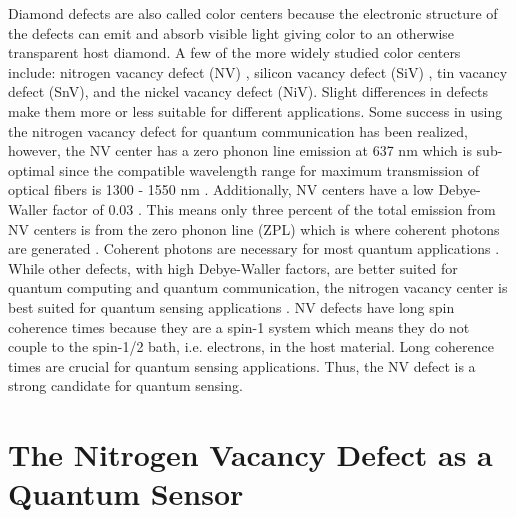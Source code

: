 	Diamond defects are also called color centers because the electronic structure of the defects can emit and absorb visible light giving color to an otherwise transparent host diamond. A few of the more widely studied color centers include: nitrogen vacancy defect (NV) \cite{Jelezko2001SpectroscopyDiamond, Gruber1997ScanningCenters}, silicon vacancy defect (SiV) \cite{Goss1996TheComplex,Clark1994SiliconDiamond}, tin vacancy defect (SnV)\cite{Iwasaki2017Tin-VacancyDiamond}, and the nickel vacancy defect (NiV)\cite{Nazare1991OpticalDiamond, Mason1999MagneticDiamond}. Slight differences in defects make them more or less suitable for different applications. Some success in using the nitrogen vacancy defect for quantum communication has been realized, however, the NV center has a zero phonon line emission at 637 nm which is sub-optimal since the compatible wavelength range for maximum transmission of optical fibers is 1300 - 1550 nm \cite{Hermans2022QubitNetwork,Hensen2015Loophole-freeKilometres}.  Additionally, NV centers have a low Debye-Waller factor of 0.03 \cite{Kehayias2013InfraredDiamond}. This means only three percent of the total emission from NV centers is from the zero phonon line (ZPL) which is where coherent photons are generated \cite{Thiering2020ColorApplications}. Coherent photons are necessary for most quantum applications \cite{Thiering2020ColorApplications}. While other defects, with high Debye-Waller factors,  are better suited for quantum computing and quantum communication, the nitrogen vacancy center is best suited for quantum sensing applications \cite{Achard2020}. NV defects have long spin coherence times because they are a spin-1 system which means they do not couple to the spin-1/2 bath, i.e. electrons,  in the host material. Long coherence times are crucial for quantum sensing applications. Thus, the NV defect is a strong candidate for quantum sensing.

\section{The Nitrogen Vacancy Defect as a Quantum Sensor}
\label{NVintro}
\indent
	
